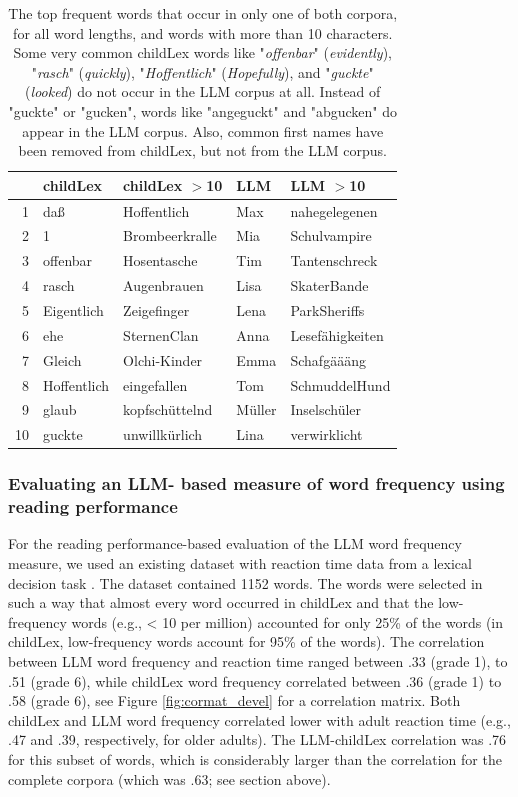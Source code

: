 \documentclass[doc, a4paper]{apa7}
\begin{document}
\begin{table}[!htbp]
\caption{The top frequent words that occur in only one of both corpora, for all word lengths, and words with more than 10 characters. Some very common childLex words like "\textit{offenbar}" (\textit{evidently}), "\textit{rasch}" (\textit{quickly}), "\textit{Hoffentlich}" (\textit{Hopefully}), and "\textit{guckte}" (\textit{looked}) do not occur in the LLM corpus at all. Instead of "guckte" or "gucken", words like "angeguckt" and "abgucken" do appear in the LLM corpus. Also, common first names have been removed from childLex, but not from the LLM corpus.}
\centering
\begin{tabular}{rllll}
  \hline
 & childLex & childLex $>$10 & LLM & LLM $>$10 \\ 
  \hline
1 & daß & Hoffentlich & Max & nahegelegenen \\ 
  2 & 1 & Brombeerkralle & Mia & Schulvampire \\ 
  3 & offenbar & Hosentasche & Tim & Tantenschreck \\ 
  4 & rasch & Augenbrauen & Lisa & SkaterBande \\ 
  5 & Eigentlich & Zeigefinger & Lena & ParkSheriffs \\ 
  6 & ehe & SternenClan & Anna & Lesefähigkeiten \\ 
  7 & Gleich & Olchi-Kinder & Emma & Schafgäääng \\ 
  8 & Hoffentlich & eingefallen & Tom & SchmuddelHund \\ 
  9 & glaub & kopfschüttelnd & Müller & Inselschüler \\ 
  10 & guckte & unwillkürlich & Lina & verwirklicht \\ 
   \hline
\end{tabular}
\label{notin}
\end{table}


\subsubsection*{Evaluating an LLM- based measure of word frequency using reading performance}

For the reading performance-based evaluation of the LLM word frequency measure, we used an existing dataset with reaction time data from a lexical decision task \citep{schroter_developmental_2017}. The dataset contained 1152 words. The words were selected in such a way that almost every word occurred in childLex and that the low-frequency words (e.g., < 10 per million) accounted for only 25\% of the words (in childLex, low-frequency words account for 95\% of the words). The correlation between LLM word frequency and reaction time ranged between .33 (grade 1), to .51 (grade 6), while childLex word frequency correlated between .36 (grade 1) to .58 (grade 6), see Figure \ref{fig:cormat_devel} for a correlation matrix. Both childLex and LLM word frequency correlated lower with adult reaction time (e.g., .47 and .39, respectively, for older adults). The LLM-childLex correlation was .76 for this subset of words, which is considerably larger than the correlation for the complete corpora (which was .63; see section above). 
\end{document}
